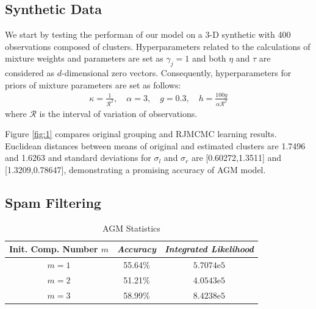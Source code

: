 \documentclass[conference]{IEEEtran}
\begin{document}
\subsection{Synthetic Data}

We start by testing the performan of our model on a 3-D synthetic with 400 observations composed of clusters. Hyperparameters related to the calculations of mixture weights and parameters are set as $\gamma_j = 1$ and both $\eta$ and $\tau$ are considered as $d$-dimensional zero vectors. Consequently, hyperparameters for priors of mixture parameters are set as follows\cite{b13}:
\begin{align}
\kappa = \frac{1}{\mathcal{R}^2}, \quad \alpha = 3, \quad g=0.3, \quad h=\frac{100g}{\alpha\mathcal{R}^2}
\label{eq:hypers}
\end{align}
where $\mathcal{R}$ is the interval of variation of observations.

Figure \ref{fig:1} compares original grouping and RJMCMC learning results. Euclidean distances between means of original and estimated clusters are 1.7496 and 1.6263 and standard deviations for $\sigma_l$ and $\sigma_r$ are [0.60272,1.3511] and [1.3209,0.78647], demonstrating a promising accuracy of AGM model.

\subsection{Spam Filtering}

\begin{table}[b]
\caption{AGM Statistics}
\begin{center}
\begin{tabular}{|c|c|c|}
\hline
\multicolumn{1}{|p{2cm}|}{\centering \textbf{Init. Comp. Number $m$}} & \multicolumn{1}{|p{2cm}|}{\centering \textbf{\textit{Accuracy}}} & \multicolumn{1}{|p{2cm}|}{\centering \textbf{\textit{Integrated Likelihood}}}\\
\hline
$m=1$ & 55.64\% & $5.7074\mathrm{e}{5}$\\
$m=2$ & 51.21\% & $4.0543\mathrm{e}{5}$ \\
$m=3$ & 58.99\% & $8.4238\mathrm{e}{5}$ \\
\hline
\end{tabular}
\label{tab1}
\end{center}
\end{table}
\end{document}
